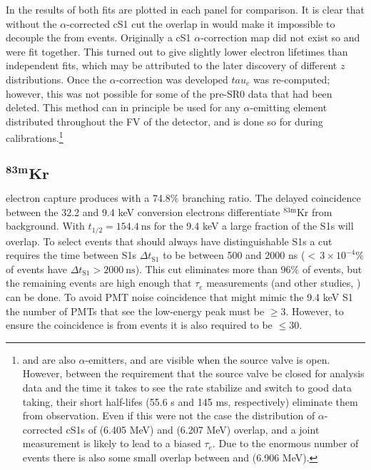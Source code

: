 In  the results of both fits are plotted in each panel for comparison.  It is
clear that without the $\alpha$-corrected cS1 cut the overlap in \stwob would make it impossible to decouple the  from
 events.  Originally a cS1 $\alpha$-correction map did not exist so  and  were fit together.  This
turned out to give slightly lower electron lifetimes than independent fits, which may be attributed to the later discovery of different $z$
distributions.  Once
the $\alpha$-correction was developed $tau_e$ was re-computed; however, this was not possible for some of the pre-SR0 data that had been
deleted.  This method can in principle be used for any $\alpha$-emitting element distributed throughout the FV of the detector, and is done so
for  during  calibrations.\footnote{ and  are also
$\alpha$-emitters, and are visible when the source valve is open.  However, between the requirement that the source valve be closed for
analysis data and the time it takes to see
the rate stabilize and switch to good data taking, their short half-lifes (55.6 s and 145 ms, respectively) eliminate them from
observation.  Even if this were not the case the distribution of $\alpha$-corrected cS1s of  (6.405 MeV) and 
(6.207 MeV) overlap, and a joint
measurement is likely to lead to a biased $\tau_e$.  Due to the enormous number of events there is also some small overlap between
 and  (6.906 MeV).}



\subsection[$\mathrm{^{83m}Kr}$][$\mathrm{^{83m}Kr}$]{$\mathbf{^{83m}Kr}$}
\label{subsec:electron_lifetimes_measurement_kr}
 electron capture produces \metakr with a 74.8\% branching ratio.  The delayed coincidence between the 32.2 and 9.4 keV
conversion electrons differentiate $\mathrm{^{83m}Kr}$ from background.  With
$t_{1/2} = 154.4\ \mathrm{ns}$ for the 9.4 keV a large fraction of the S1s will overlap.  To select events that should always have
distinguishable S1s a cut requires
the time between S1s $\Delta t_{\mathrm{S1}}$ to be between 500 and 2000 ns (${<}\, 3 \times 10^{-4}\%$ of events have
$\Delta t_{\mathrm{S1}} > 2000\ \mathrm{ns}$).  This cut eliminates more than 96\% of \metakr events, but the remaining events are high
enough that $\tau_e$ measurements (and other studies, ) can be done.  To avoid PMT noise coincidence that might mimic
the 9.4 keV S1
the number of PMTs that see the low-energy peak must be $\geq 3$.  However, to ensure the coincidence is from \metakr events it is also
required to be $\leq 30$.

